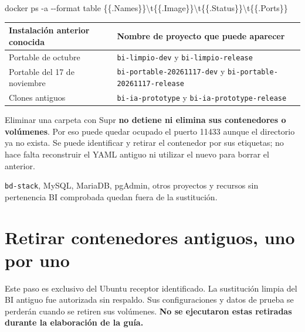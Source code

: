 \documentclass[
  spanish,
  10pt,
  a4paper,
]{article}
\newenvironment{Shaded}{}{}
\newcommand{\AttributeTok}[1]{#1}
\newcommand{\ExtensionTok}[1]{#1}
\newcommand{\NormalTok}[1]{#1}
\newcommand{\StringTok}[1]{#1}
\renewenvironment{Shaded}{\begin{snugshade}}{\end{snugshade}}%
\begin{document}
\begin{Shaded}
\begin{Highlighting}[]
\ExtensionTok{docker}\NormalTok{ ps }\AttributeTok{{-}a} \AttributeTok{{-}{-}format} \StringTok{\textquotesingle{}table \{\{.Names\}\}\textbackslash{}t\{\{.Image\}\}\textbackslash{}t\{\{.Status\}\}\textbackslash{}t\{\{.Ports\}\}\textquotesingle{}}
\end{Highlighting}
\end{Shaded}

\begin{longtable}[]{@{}
  >{\raggedright\arraybackslash}p{}
  >{\raggedright\arraybackslash}p{}@{}}
\toprule\noalign{}
\begin{minipage}[b]{\linewidth}\raggedright
Instalación anterior conocida
\end{minipage} & \begin{minipage}[b]{\linewidth}\raggedright
Nombre de proyecto que puede aparecer
\end{minipage} \\
\midrule\noalign{}
\endhead
\bottomrule\noalign{}
\endlastfoot
Portable de octubre & \texttt{bi-limpio-dev} y
\texttt{bi-limpio-release} \\
Portable del 17 de noviembre & \texttt{bi-portable-20261117-dev} y
\texttt{bi-portable-20261117-release} \\
Clones antiguos & \texttt{bi-ia-prototype} y
\texttt{bi-ia-prototype-release} \\
\end{longtable}

Eliminar una carpeta con Supr \textbf{no detiene ni elimina sus
contenedores o volúmenes}. Por eso puede quedar ocupado el puerto 11433
aunque el directorio ya no exista. Se puede identificar y retirar el
contenedor por sus etiquetas; no hace falta reconstruir el YAML antiguo
ni utilizar el nuevo para borrar el anterior.

\texttt{bd-stack}, MySQL, MariaDB, pgAdmin, otros proyectos y recursos
sin pertenencia BI comprobada quedan fuera de la sustitución.

\clearpage

\section{Retirar contenedores antiguos, uno por
uno}\label{retirar-contenedores-antiguos-uno-por-uno}

Este paso es exclusivo del Ubuntu receptor identificado. La sustitución
limpia del BI antiguo fue autorizada sin respaldo. Sus configuraciones y
datos de prueba se perderán cuando se retiren sus volúmenes. \textbf{No
se ejecutaron estas retiradas durante la elaboración de la guía.}
\end{document}
